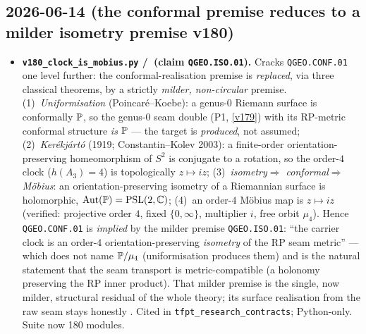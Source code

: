 \subsection*{2026-06-14 (the conformal premise reduces to a milder isometry premise v180)}
\begin{itemize}
\item \textbf{\texttt{v180\_clock\_is\_mobius.py} \mE/\mO\ (claim \texttt{QGEO.ISO.01}).} Cracks
  \texttt{QGEO.CONF.01} one level further: the conformal-realisation premise is \emph{replaced}, via
  three classical theorems, by a strictly \emph{milder, non-circular} premise. (1)~\emph{Uniformisation}
  (Poincar\'e--Koebe): a genus-$0$ Riemann surface is conformally $\mathbb{P}$, so the genus-$0$ seam double
  (P1, \vref{v179}) with its RP-metric conformal structure \emph{is} $\mathbb{P}$ --- the target is
  \emph{produced}, not assumed; (2)~\emph{Ker\'ekj\'art\'o} (1919; Constantin--Kolev 2003): a
  finite-order orientation-preserving homeomorphism of $S^2$ is conjugate to a rotation, so the
  order-$4$ clock ($h(A_3){=}4$) is topologically $z\mapsto iz$; (3)~\emph{isometry$\Rightarrow$
  conformal$\Rightarrow$M\"obius}: an orientation-preserving isometry of a Riemannian surface is
  holomorphic, $\mathrm{Aut}(\mathbb{P})=\mathrm{PSL}(2,\mathbb C)$; (4)~an order-$4$ M\"obius map is
  $z\mapsto iz$ (verified: projective order $4$, fixed $\{0,\infty\}$, multiplier $i$, free orbit
  $\mu_4$). Hence \texttt{QGEO.CONF.01} is \emph{implied} by the milder premise \texttt{QGEO.ISO.01}:
  ``the carrier clock is an order-$4$ orientation-preserving \emph{isometry} of the RP seam metric'' ---
  which does not name $\mathbb{P}/\mu_4$ (uniformisation produces them) and is the natural statement that the
  seam transport is metric-compatible (a holonomy preserving the RP inner product). That milder premise
  is the single, now milder, structural residual of the whole theory; its surface realisation from the
  raw seam stays honestly \mO. Cited in \texttt{tfpt\_research\_contracts}; Python-only. Suite now 180
  modules.
\end{itemize}

